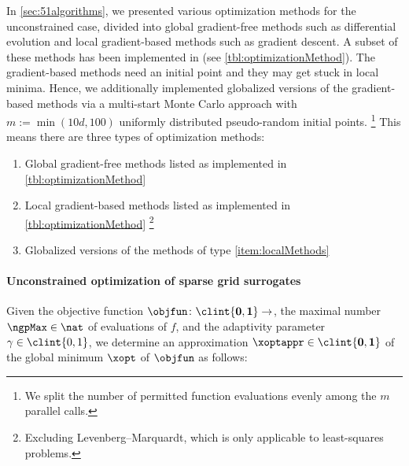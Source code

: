 In \cref{sec:51algorithms}, we presented various optimization methods
for the unconstrained case,
divided into global gradient-free methods such as differential evolution and
local gradient-based methods such as gradient descent.
A subset of these methods has been implemented in \sgpp
(see \cref{tbl:optimizationMethod}).
The gradient-based methods need an initial point and
they may get stuck in local minima.
Hence, we additionally implemented globalized versions
of the gradient-based methods
via a multi-start Monte Carlo approach with $m := \min(10d, 100)$
uniformly distributed pseudo-random initial points.%
\footnote{%
  We split the number of permitted function evaluations evenly
  among the $m$ parallel calls.%
}
This means there are three types of optimization methods:

\begin{enumerate}[label={(T\arabic*)},leftmargin=*]
  \item
  \label{item:globalMethods}
  Global gradient-free methods listed as implemented in
  \cref{tbl:optimizationMethod}
  
  \item
  \label{item:localMethods}
  Local gradient-based methods listed as implemented in
  \cref{tbl:optimizationMethod}%
  \footnote{%
     Excluding Levenberg--Marquardt, which is only applicable
     to least-squares problems.%
  }
  
  \item
  \label{item:globalizedMethods}
  Globalized versions of the methods of type \ref{item:localMethods}
\end{enumerate}

\paragraph{Unconstrained optimization of sparse grid surrogates}

Given the objective function $\objfun\colon \clint{\*0, \*1} \to \real$,
the maximal number $\ngpMax \in \nat$ of evaluations of $f$, and
the adaptivity parameter $\gamma \in \clint{0, 1}$,
we determine an approximation $\xoptappr \in \clint{\*0, \*1}$
of the global minimum $\xopt$ of $\objfun$ as follows:

